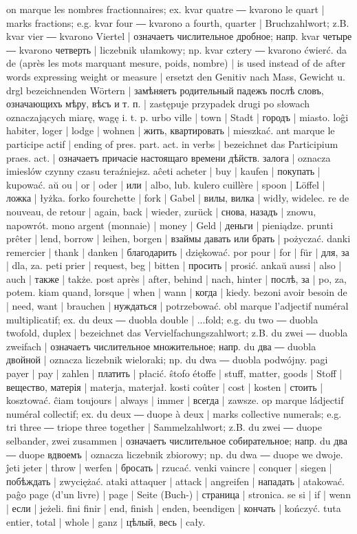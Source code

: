 on marque les nombres fractionnaires; ex. kvar quatre ― kvarono le quart | marks fractions; e.g. kvar four ― kvarono a fourth, quarter | Bruchzahlwort; z.B. kvar vier ― kvarono Viertel | означаетъ числительное дробное; напр. kvar четыре ― kvarono четверть | liczebnik ułamkowy; np. kvar cztery ― kvarono ćwierć.
da de (après les mots marquant mesure, poids, nombre) | is used instead of de after words expressing weight or measure | ersetzt den Genitiv nach Mass, Gewicht u. drgl bezeichnenden Wörtern | замѣняетъ родительный падежъ послѣ словъ, означающихъ мѣру, вѣсъ и т. п. | zastępuje przypadek drugi po słowach oznaczających miarę, wagę i. t. p.
urbo ville | town | Stadt | городъ | miasto.
loĝi habiter, loger | lodge | wohnen | жить, квартировать | mieszkać.
ant marque le participe actif | ending of pres. part. act. in verbs | bezeichnet das Participium praes. act. | означаетъ причасіе настоящаго времени дѣйств. залога | oznacza imieslów czynny czasu teraźniejsz.
aĉeti acheter | buy | kaufen | покупать | kupować.
aŭ ou | or | oder | или | albo, lub.
kulero cuillère | spoon | Löffel | ложка | łyżka.
forko fourchette | fork | Gabel | вилы, вилка | widły, widelec.
re de nouveau, de retour | again, back | wieder, zurück | снова, назадъ | znowu, napowrót.
mono argent (monnaie) | money | Geld | деньги | pieniądze.
prunti prêter | lend, borrow | leihen, borgen | взаймы давать или брать | pożyczać.
danki remercier | thank | danken | благодарить | dziękować.
por pour | for | für | для, за | dla, za.
peti prier | request, beg | bitten | просить | prosić.
ankaŭ aussi | also | auch | также | także.
post après | after, behind | nach, hinter | послѣ, за | po, za, potem.
kiam quand, lorsque | when | wann | когда | kiedy.
bezoni avoir besoin de | need, want | brauchen | нуждаться | potrzebować.
obl marque l’adjectif numéral multiplicatif; ex. du deux ― duobla double | ...fold; e.g. du two ― duobla twofold, duplex | bezeichnet das Vervielfachungszahlwort; z.B. du zwei ― duobla zweifach | означаетъ числительное множительное; напр. du два ― duobla двойной | oznacza liczebnik wieloraki; np. du dwa ― duobla podwójny.
pagi payer | pay | zahlen | платить | płacić.
ŝtofo étoffe | stuff, matter, goods | Stoff | вещество, матерія | materja, materjał.
kosti coûter | cost | kosten | стоить | kosztować.
ĉiam toujours | always | immer | всегда | zawsze.
op marque ládjectif numéral collectif; ex. du deux ― duope à deux | marks collective numerals; e.g. tri three ― triope three together | Sammelzahlwort; z.B. du zwei ― duope selbander, zwei zusammen | означаетъ числительное собирательное; напр. du два ― duope вдвоемъ | oznacza liczebnik zbiorowy; np. du dwa ― duope we dwoje.
ĵeti jeter | throw | werfen | бросать | rzucać.
venki vaincre | conquer | siegen | побѣждать | zwyciężać.
ataki attaquer | attack | angreifen | нападать | atakować.
paĝo page (d’un livre) | page | Seite (Buch-) | страница | stronica.
se si | if | wenn | если | jeżeli.
fini finir | end, finish | enden, beendigen | кончать | kończyć.
tuta entier, total | whole | ganz | цѣлый, весь | cały.

